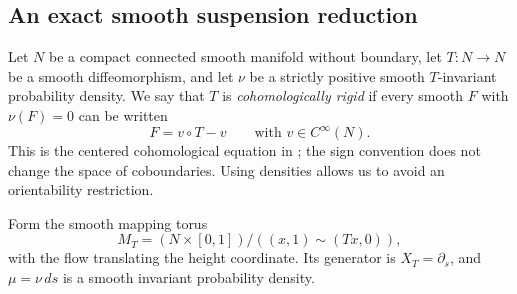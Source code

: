 \documentclass[11pt]{article}
\theoremstyle{definition}
\theoremstyle{remark}
\begin{document}
\subsection{An exact smooth suspension reduction}

Let $N$ be a compact connected smooth manifold without boundary, let $T:N\to N$ be a smooth diffeomorphism, and let $\nu$ be a strictly positive smooth $T$-invariant probability density. We say that $T$ is \emph{cohomologically rigid} if every smooth $F$ with $\nu(F)=0$ can be written
\begin{equation}\label{eq:discrete-cohomology}
 F=v\circ T-v\qquad\text{with }v\in C^\infty(N).
\end{equation}
This is the centered cohomological equation in \cite[\S1.1, p.~2]{Kar}; the sign convention does not change the space of coboundaries. Using densities allows us to avoid an orientability restriction.

Form the smooth mapping torus
\[
 M_T=(N\times[0,1])/((x,1)\sim(Tx,0)),
\]
with the flow translating the height coordinate. Its generator is $X_T=\partial_s$, and $\mu=\nu\,ds$ is a smooth invariant probability density.
\end{document}
